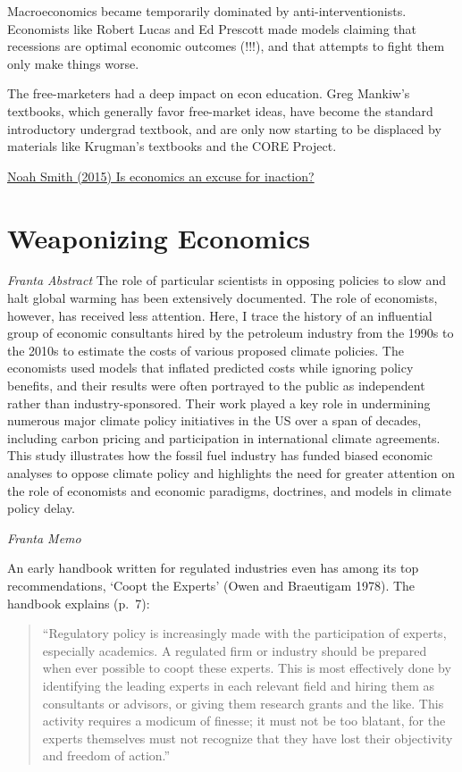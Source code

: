 \documentclass[
]{book}
\begin{document}
Macroeconomics became temporarily dominated by anti-interventionists. Economists like Robert Lucas and Ed Prescott made models claiming that recessions are optimal economic outcomes (!!!), and that attempts to fight them only make things worse.

The free-marketers had a deep impact on econ education. Greg Mankiw's textbooks, which generally favor free-market ideas, have become the standard introductory undergrad textbook, and are only now starting to be displaced by materials like Krugman's textbooks and the CORE Project.

\href{https://noahpinion.substack.com/p/is-economics-an-excuse-for-inaction}{Noah Smith (2015) Is economics an excuse for inaction?}

\hypertarget{weaponizing-economics}{%
\section{Weaponizing Economics}\label{weaponizing-economics}}

\emph{Franta Abstract}
The role of particular scientists in opposing policies to slow and halt global
warming has been extensively documented. The role of economists, however,
has received less attention. Here, I trace the history of an influential group of
economic consultants hired by the petroleum industry from the 1990s to the
2010s to estimate the costs of various proposed climate policies. The economists
used models that inflated predicted costs while ignoring policy benefits,
and their results were often portrayed to the public as independent rather than
industry-sponsored. Their work played a key role in undermining numerous
major climate policy initiatives in the US over a span of decades, including
carbon pricing and participation in international climate agreements. This study
illustrates how the fossil fuel industry has funded biased economic analyses to
oppose climate policy and highlights the need for greater attention on the role
of economists and economic paradigms, doctrines, and models in climate
policy delay.

\emph{Franta Memo}

An early
handbook written for regulated industries even has among its top recommendations,
`Coopt the Experts' (Owen and Braeutigam 1978). The handbook explains (p.~7):

\begin{quote}
``Regulatory policy is increasingly made with the participation of experts,
especially academics. A regulated firm or industry should be prepared when­
ever possible to coopt these experts. This is most effectively done by identifying
the leading experts in each relevant field and hiring them as consultants or
advisors, or giving them research grants and the like. This activity requires
a modicum of finesse; it must not be too blatant, for the experts themselves
must not recognize that they have lost their objectivity and freedom of action.''
\end{quote}
\end{document}
